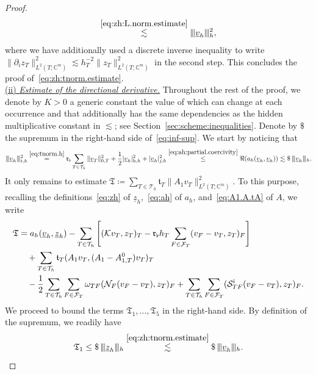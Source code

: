 \documentclass[11pt,a4paper]{article}
\theoremstyle{plain}
\theoremstyle{remark}
\theoremstyle{definition}
\newcommand{\Complex}{\mathbb{C}}
\newcommand{\Th}{\mathcal{T}_h}
\newcommand{\FT}{\mathcal{F}_T}
\newcommand{\norm}[2]{\|#2\|_{#1}}
\newcommand{\seminorm}[2]{|#2|_{#1}}
\newcommand{\tnorm}[2]{|\kern-0.25ex|\kern-0.25ex|#2|\kern-0.25ex|\kern-0.25ex|_{#1}}
\newcommand{\term}{\mathfrak{T}}
\newcommand{\tref}{\mathfrak{t}_T}
\newcommand{\Kmin}{\mathfrak{r}_\flat}
\begin{document}
\begin{proof}
\[\begin{aligned}
    \overset{\eqref{eq:zh:L.norm.estimate}}\lesssim
    \tnorm{h}{\underline{v}_h}^2,
  \end{aligned}
  \]
  where we have additionally used a discrete inverse inequality to write $\norm{L^2(T;\Complex^m)}{\partial_i z_T}^2 \lesssim h_T^{-2} \norm{L^2(T;\Complex^m)}{z_T}^2$ in the second step.
  This concludes the proof of~\eqref{eq:zh:tnorm.estimate}.
  \medskip \\
  \underline{(ii) \emph{Estimate of the directional derivative.}}
  Throughout the rest of the proof, we denote by $K > 0$ a generic constant the value of which can change at each occurrence and that additionally has the same dependencies as the hidden multiplicative constant in $\lesssim$; see Section~\ref{sec:scheme:inequalities}.
  Denote by $\$$ the supremum in the right-hand side of~\eqref{eq:inf-sup}.
  We start by noticing that
  \begin{equation}\label{eq:inf-sup:partial.coercivity}
    \tnorm{\flat,h}{\underline{v}_h}^2
    \overset{\eqref{eq:tnorm.h}}=
    \Kmin \sum_{T \in \Th} \norm{0,T}{\underline{v}_T}^2
    + \frac12 \seminorm{{\rm b},h}{\underline{v}_h}^2
    + \seminorm{j,h}{\underline{v}_h}^2
    \overset{\eqref{eq:ah:partial.coercivity}}\le \Re(a_h(\underline{v}_h, \underline{v}_h))
    \lesssim \$\, \tnorm{h}{\underline{v}_h}.
  \end{equation}
  It only remains to estimate $\term \coloneqq \sum_{T \in \Th} \tref \norm{L^2(T;\Complex^m)}{A_1 v_T}^2$.
  To this purpose, recalling the definitions~\eqref{eq:zh} of $\underline{z}_h$,~\eqref{eq:ah} of $a_h$, and~\eqref{eq:A1.A.tA} of $A$, we write
  \[
  \begin{aligned}
    \term
    &=
    a_h(\underline{v}_h, \underline{z}_h)
    - \sum_{T \in \Th} \left[
      (\mathcal{K} v_T, z_T)_T
      - \Kmin h_T \sum_{F \in \FT} (v_F - v_T, z_T)_F
      \right]
    \\
    &\quad
    + \sum_{T \in \Th} \tref (A_1 v_T, (A_1 - A_{1,T}^0) v_T)_T
    \\
    &\quad
    - \frac12 \sum_{T \in \Th} \sum_{F \in \FT} \omega_{TF} (\mathcal{N}_F (v_F - v_T), z_T)_F
    + \sum_{T \in \Th} \sum_{F \in \FT} (\mathcal{S}_{TF}^{\rm i}(v_F - v_T), z_T)_F.
  \end{aligned}
  \]
  We proceed to bound the terms $\term_1,\ldots,\term_5$ in the right-hand side.
  By definition of the supremum, we readily have
  \[
  \term_1 \le \$\, \tnorm{h}{\underline{z}_h}
  \overset{\eqref{eq:zh:tnorm.estimate}}\lesssim
  \$\,  \tnorm{h}{\underline{v}_h}.
  \]

\end{proof}
\end{document}

